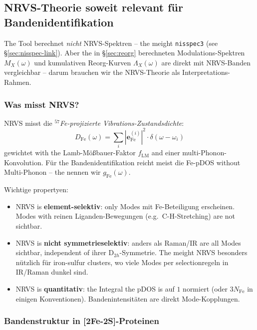 \documentclass[11pt,a4paper,twoside]{article}
\theoremstyle{remark}
\begin{document}
\subsection{NRVS-Theorie soweit relevant f\"ur Bandenidentifikation}
\label{sec:nrvs}

The Tool berechnet \emph{nicht} NRVS-Spektren -- the meight
\texttt{nisspec3} (see \S\ref{sec:nisspec-link}). Aber the in
\S\ref{sec:reorg} berechneten Modulations-Spektren $M_X(\omega)$ und
kumulativen Reorg-Kurven $\Lambda_X(\omega)$ are direkt mit
NRVS-Banden vergleichbar -- darum brauchen wir the NRVS-Theorie als
Interpretations-Rahmen.

\subsubsection*{Was misst NRVS?}

NRVS \cite{Sturhahn2004} misst die
\emph{$^{57}$Fe-projizierte Vibrations-Zustandsdichte}:
\begin{equation}
  D_\text{Fe}(\omega) = \sum_i |\mathbf{e}_\text{Fe}^{(i)}|^2 \cdot
                          \delta(\omega - \omega_i)
  \label{eq:fe-pdos}
\end{equation}
gewichtet with the Lamb-M\"o{\ss}bauer-Faktor $f_\text{LM}$ and einer
multi-Phonon-Konvolution. F\"ur the Bandenidentifikation reicht meist
die Fe-pDOS without Multi-Phonon -- the nennen wir $g_\text{Fe}(\omega)$.

Wichtige propertyen:
\begin{itemize}\setlength{\itemsep}{0pt}
  \item NRVS is \textbf{element-selektiv}: only Modes mit
        Fe-Beteiligung erscheinen. Modes with reinen Liganden-Bewegungen
        (e.g.\ C-H-Stretching) are not sichtbar.
  \item NRVS is \textbf{nicht symmetrieselektiv}: anders als
        Raman/IR are all Modes sichtbar, independent of ihrer
        D$_{2h}$-Symmetrie. The meight NRVS besonders n\"utzlich f\"ur
        iron-sulfur clusters, wo viele Modes per
        selectionregeln in IR/Raman dunkel sind.
  \item NRVS is \textbf{quantitativ}: the Integral the pDOS is auf
        $1$ normiert (oder $3 N_\text{Fe}$ in einigen
        Konventionen). Bandenintensit\"aten are direkt
        Mode-Kopplungen.
\end{itemize}

\subsubsection*{Bandenstruktur in [2Fe-2S]-Proteinen}
\end{document}
